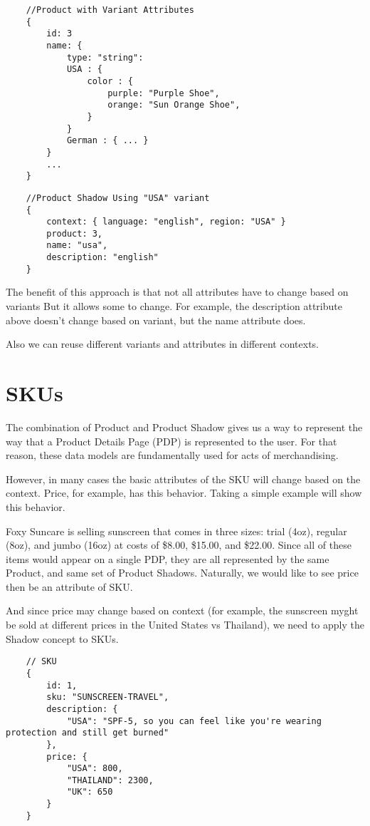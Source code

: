 \documentclass[11pt]{article}
\begin{document}
\begin{lstlisting}
    //Product with Variant Attributes
    {
        id: 3
        name: { 
            type: "string": 
            USA : {  
                color : {
                    purple: "Purple Shoe", 
                    orange: "Sun Orange Shoe", 
                }
            }
            German : { ... }
        }
        ...
    }
\end{lstlisting}

\begin{lstlisting}
    //Product Shadow Using "USA" variant
    {
        context: { language: "english", region: "USA" }
        product: 3,
        name: "usa",
        description: "english"
    }
\end{lstlisting}

The benefit of this approach is that not all attributes have to change based on variants
But it allows some to change. For example, the description attribute above doesn't
change based on variant, but the name attribute does.

Also we can reuse different variants and attributes in different contexts.

\newpage
\section{SKUs}

The combination of Product and Product Shadow gives us a way to represent the way that a
Product Details Page (PDP) is represented to the user. For that reason, these data models
are fundamentally used for acts of merchandising.

However, in many cases the basic attributes of the SKU will change based on the context.
Price, for example, has this behavior. Taking a simple example will show this behavior.

Foxy Suncare is selling sunscreen that comes in three sizes: trial (4oz), regular (8oz),
and jumbo (16oz) at costs of \$8.00, \$15.00, and \$22.00. Since all of these items would
appear on a single PDP, they are all represented by the same Product, and same set of
Product Shadows. Naturally, we would like to see price then be an attribute of SKU.

And since price may change based on context (for example, the sunscreen myght be sold at
different prices in the United States vs Thailand), we need to apply the Shadow concept to
SKUs.

\begin{lstlisting}
    // SKU
    {
        id: 1,
        sku: "SUNSCREEN-TRAVEL",
        description: {
            "USA": "SPF-5, so you can feel like you're wearing protection and still get burned"
        },
        price: {
            "USA": 800,
            "THAILAND": 2300,
            "UK": 650
        }
    }
\end{lstlisting}
\end{document}
